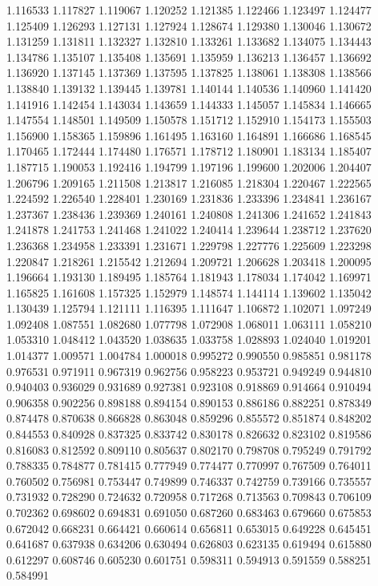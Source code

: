 1.116533
1.117827
1.119067
1.120252
1.121385
1.122466
1.123497
1.124477
1.125409
1.126293
1.127131
1.127924
1.128674
1.129380
1.130046
1.130672
1.131259
1.131811
1.132327
1.132810
1.133261
1.133682
1.134075
1.134443
1.134786
1.135107
1.135408
1.135691
1.135959
1.136213
1.136457
1.136692
1.136920
1.137145
1.137369
1.137595
1.137825
1.138061
1.138308
1.138566
1.138840
1.139132
1.139445
1.139781
1.140144
1.140536
1.140960
1.141420
1.141916
1.142454
1.143034
1.143659
1.144333
1.145057
1.145834
1.146665
1.147554
1.148501
1.149509
1.150578
1.151712
1.152910
1.154173
1.155503
1.156900
1.158365
1.159896
1.161495
1.163160
1.164891
1.166686
1.168545
1.170465
1.172444
1.174480
1.176571
1.178712
1.180901
1.183134
1.185407
1.187715
1.190053
1.192416
1.194799
1.197196
1.199600
1.202006
1.204407
1.206796
1.209165
1.211508
1.213817
1.216085
1.218304
1.220467
1.222565
1.224592
1.226540
1.228401
1.230169
1.231836
1.233396
1.234841
1.236167
1.237367
1.238436
1.239369
1.240161
1.240808
1.241306
1.241652
1.241843
1.241878
1.241753
1.241468
1.241022
1.240414
1.239644
1.238712
1.237620
1.236368
1.234958
1.233391
1.231671
1.229798
1.227776
1.225609
1.223298
1.220847
1.218261
1.215542
1.212694
1.209721
1.206628
1.203418
1.200095
1.196664
1.193130
1.189495
1.185764
1.181943
1.178034
1.174042
1.169971
1.165825
1.161608
1.157325
1.152979
1.148574
1.144114
1.139602
1.135042
1.130439
1.125794
1.121111
1.116395
1.111647
1.106872
1.102071
1.097249
1.092408
1.087551
1.082680
1.077798
1.072908
1.068011
1.063111
1.058210
1.053310
1.048412
1.043520
1.038635
1.033758
1.028893
1.024040
1.019201
1.014377
1.009571
1.004784
1.000018
0.995272
0.990550
0.985851
0.981178
0.976531
0.971911
0.967319
0.962756
0.958223
0.953721
0.949249
0.944810
0.940403
0.936029
0.931689
0.927381
0.923108
0.918869
0.914664
0.910494
0.906358
0.902256
0.898188
0.894154
0.890153
0.886186
0.882251
0.878349
0.874478
0.870638
0.866828
0.863048
0.859296
0.855572
0.851874
0.848202
0.844553
0.840928
0.837325
0.833742
0.830178
0.826632
0.823102
0.819586
0.816083
0.812592
0.809110
0.805637
0.802170
0.798708
0.795249
0.791792
0.788335
0.784877
0.781415
0.777949
0.774477
0.770997
0.767509
0.764011
0.760502
0.756981
0.753447
0.749899
0.746337
0.742759
0.739166
0.735557
0.731932
0.728290
0.724632
0.720958
0.717268
0.713563
0.709843
0.706109
0.702362
0.698602
0.694831
0.691050
0.687260
0.683463
0.679660
0.675853
0.672042
0.668231
0.664421
0.660614
0.656811
0.653015
0.649228
0.645451
0.641687
0.637938
0.634206
0.630494
0.626803
0.623135
0.619494
0.615880
0.612297
0.608746
0.605230
0.601751
0.598311
0.594913
0.591559
0.588251
0.584991
